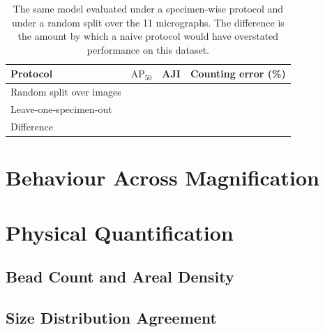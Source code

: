 
\begin{table}[htbp]
    \centering
    \caption{The same model evaluated under a specimen-wise protocol and under a
    random split over the 11 micrographs. The difference is the amount by which a
    naive protocol would have overstated performance on this dataset.}
    \label{tab:leakage}
    \begin{tabular}{lrrr}
        \toprule
        Protocol & $\mathrm{AP}_{50}$ & AJI & Counting error (\%) \\
        \midrule
        Random split over images & & & \\
        Leave-one-specimen-out   & & & \\
        \midrule
        Difference & & & \\
        \bottomrule
    \end{tabular}
\end{table}

\section{Behaviour Across Magnification}


\section{Physical Quantification}

\subsection{Bead Count and Areal Density}

\subsection{Size Distribution Agreement}


